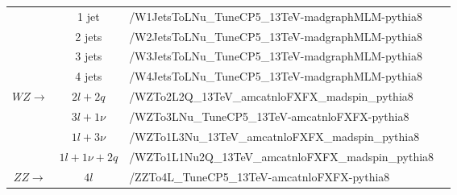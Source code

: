 \begin{table}[]
{{\begin{tabular}{|cclc|}
\multicolumn{1}{|c|}{}                                            & \multicolumn{1}{c|}{1 jet}                  & \multicolumn{1}{l|}{/W1JetsToLNu\_TuneCP5\_13TeV-madgraphMLM-pythia8}                                    &                       \\ \cline{2-4} 
\multicolumn{1}{|c|}{}                                            & \multicolumn{1}{c|}{2 jets}                 & \multicolumn{1}{l|}{/W2JetsToLNu\_TuneCP5\_13TeV-madgraphMLM-pythia8}                                    &                       \\ \cline{2-4} 
\multicolumn{1}{|c|}{}                                            & \multicolumn{1}{c|}{3 jets}                 & \multicolumn{1}{l|}{/W3JetsToLNu\_TuneCP5\_13TeV-madgraphMLM-pythia8}                                    &                       \\ \cline{2-4} 
\multicolumn{1}{|c|}{}                                            & \multicolumn{1}{c|}{4 jets}                 & \multicolumn{1}{l|}{/W4JetsToLNu\_TuneCP5\_13TeV-madgraphMLM-pythia8}                                    &                       \\ \hline
\multicolumn{1}{|c|}{\multirow{4}{*}{$WZ\rightarrow$}}            & \multicolumn{1}{c|}{$2l+2q$}                & \multicolumn{1}{l|}{/WZTo2L2Q\_13TeV\_amcatnloFXFX\_madspin\_pythia8}                                    &                       \\ \cline{2-4} 
\multicolumn{1}{|c|}{}                                            & \multicolumn{1}{c|}{$3l+1\nu$}              & \multicolumn{1}{l|}{/WZTo3LNu\_TuneCP5\_13TeV-amcatnloFXFX-pythia8}                                      &                       \\ \cline{2-4} 
\multicolumn{1}{|c|}{}                                            & \multicolumn{1}{c|}{$1l+3\nu$}              & \multicolumn{1}{l|}{/WZTo1L3Nu\_13TeV\_amcatnloFXFX\_madspin\_pythia8}                                   &                       \\ \cline{2-4} 
\multicolumn{1}{|c|}{}                                            & \multicolumn{1}{c|}{$1l+1\nu+2q$}           & \multicolumn{1}{l|}{/WZTo1L1Nu2Q\_13TeV\_amcatnloFXFX\_madspin\_pythia8}                                 &                       \\ \hline
\multicolumn{1}{|c|}{\multirow{3}{*}{$ZZ\rightarrow$}}            & \multicolumn{1}{c|}{$4l$}                   & \multicolumn{1}{l|}{/ZZTo4L\_TuneCP5\_13TeV-amcatnloFXFX-pythia8}                                        &                       \\ \cline{2-4} 

\end{tabular}}}
\end{table}
